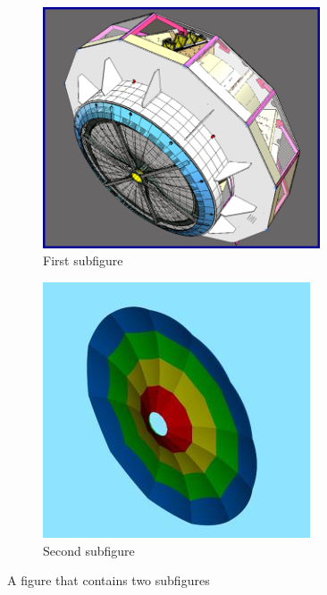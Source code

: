 \begin{figure}
\begin{subfigure}[b]{0.49\textwidth}
    \includegraphics[width=0.9\textwidth]{Picture_3.png}
    \caption{First subfigure} \label{fig:subfig1_a}
\end{subfigure}
\hspace*{\fill} %
\begin{subfigure}[b]{0.49\textwidth}
    \includegraphics[width=0.9\linewidth]{ZERKALO.jpg}
    \caption{Second subfigure} \label{fig:subfig1_b}
\end{subfigure}
\caption{A figure that contains two subfigures} \label{fig:subfig1}
\end{figure}

